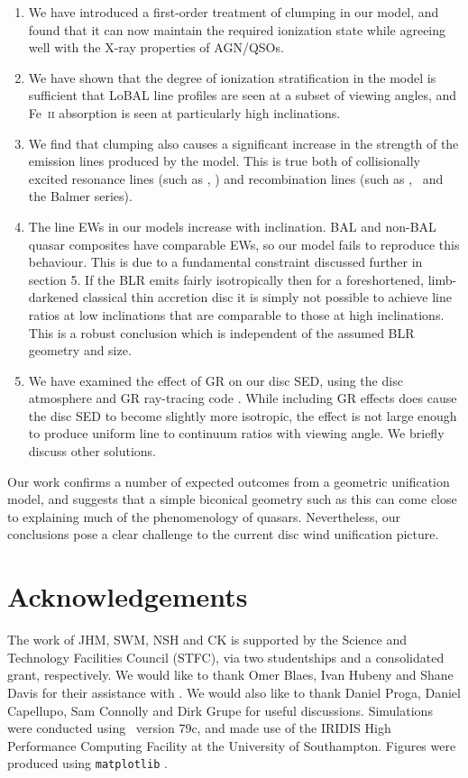 \documentclass[preprint, a4paper, 11pt]{aastex}
\begin{document}
\begin{enumerate}
\item We have introduced a first-order treatment 
of clumping in our model, and found that it can now maintain
the required ionization state while agreeing well with the X-ray
properties of AGN/QSOs.
\smallskip
\item We have shown that the degree of ionization stratification
in the model is sufficient that LoBAL line profiles
are seen at a subset of viewing angles, and Fe~\textsc{ii}
absorption is seen at particularly high inclinations.
\smallskip
\item We find that clumping also causes a significant 
increase in the strength of the  emission
lines produced by the model. This is true both
of collisionally excited resonance lines (such as \civ, \nv)
and recombination lines (such as \la, \ha\ and the Balmer series).
\smallskip
\item The line EWs in our models increase with inclination.
BAL and non-BAL quasar composites have comparable EWs, so our model
fails to reproduce this behaviour.
This is due to a fundamental constraint discussed further in section 5. If the BLR
emits fairly isotropically then for a foreshortened, limb-darkened classical thin accretion disc
it is simply not possible to achieve line ratios at low inclinations that are comparable to
those at high inclinations. This is a robust conclusion which 
is independent of the assumed BLR geometry and size.
\smallskip
\item We have examined the effect of GR on our disc SED, using the disc atmosphere
and GR ray-tracing code \agn. While including GR effects
does cause the disc SED to become slightly more isotropic,
the effect is not large enough to produce uniform line to continuum ratios
with viewing angle. We briefly discuss other solutions.
\end{enumerate}
Our work confirms a number of expected outcomes from a geometric unification 
model, and suggests that a simple biconical geometry such as this can come close to 
explaining much of the  phenomenology of quasars. Nevertheless, our conclusions pose 
a clear challenge to the current disc wind unification picture.




\section*{Acknowledgements}

The work of JHM, SWM, NSH and CK is supported by the 
Science and Technology Facilities Council (STFC), 
via two studentships and a consolidated grant, respectively.
We would like to thank Omer Blaes, Ivan Hubeny and Shane Davis for their
assistance with \agn. We would also like to thank Daniel Proga, 
Daniel Capellupo, Sam Connolly and Dirk Grupe for useful discussions.
Simulations were conducted using \py\ version 79c, and made use of
the IRIDIS High Performance Computing Facility at the University of Southampton.
Figures were produced using {\tt matplotlib} \citep{matplotlib}.




\clearpage
\clearpage
\end{document}
